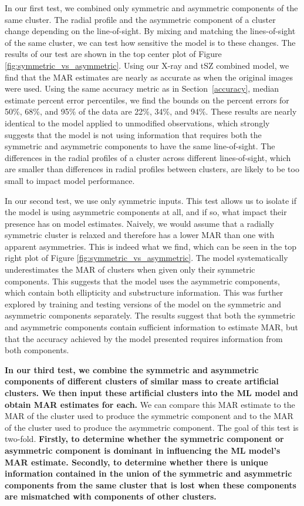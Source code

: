\documentclass[twocolumn, linenumbers, 11pt]{aastex63}%
\begin{document}
In our first test, we combined only symmetric and asymmetric components of the same cluster. The radial profile and the asymmetric component of a cluster change depending on the line-of-sight. By mixing and matching the lines-of-sight of the same cluster, we can test how sensitive the model is to these changes. The results of our test are shown in the top center plot of Figure \ref{fig:symmetric_vs_asymmetric}. Using our X-ray and tSZ combined model, we find that the MAR estimates are nearly as accurate as when the original images were used. Using the same accuracy metric as in Section~\ref{accuracy}, median estimate percent error percentiles, we find the bounds on the percent errors for 50\%, 68\%, and 95\% of the data are 22\%, 34\%, and 94\%. These results are nearly identical to the model applied to unmodified observations, which strongly suggests that the model is not using information that requires both the symmetric and asymmetric components to have the same line-of-sight. The differences in the radial profiles of a cluster across different lines-of-sight, which are smaller than differences in radial profiles between clusters, are likely to be too small to impact model performance.


In our second test, we use only symmetric inputs. This test allows us to isolate if the model is using asymmetric components at all, and if so, what impact their presence has on model estimates. Naively, we would assume that a radially symmetric cluster is relaxed and therefore has a lower MAR than one with apparent asymmetries. This is indeed what we find, which can be seen in the top right plot of Figure \ref{fig:symmetric_vs_asymmetric}. The model systematically underestimates the MAR of clusters when given only their symmetric components. This suggests that the model uses the asymmetric components, which contain both ellipticity and substructure information. This was further explored by training and testing versions of the model on the symmetric and asymmetric components separately. The results suggest that both the symmetric and asymmetric components contain sufficient information to estimate MAR, but that the accuracy achieved by the model presented requires information from both components.

\textbf{In our third test, we combine the symmetric and asymmetric components of different clusters of similar mass to create artificial clusters. We then input these artificial clusters into the ML model and obtain MAR estimates for each.} We can compare this MAR estimate to the MAR of the cluster used to produce the symmetric component and to the MAR of the cluster used to produce the asymmetric component. The goal of this test is two-fold. \textbf{Firstly, to determine whether the symmetric component or asymmetric component is dominant in influencing the ML model's MAR estimate. Secondly, to determine whether there is unique information contained in the union of the symmetric and asymmetric components from the same cluster that is lost when these components are mismatched with components of other clusters.}
\end{document}
